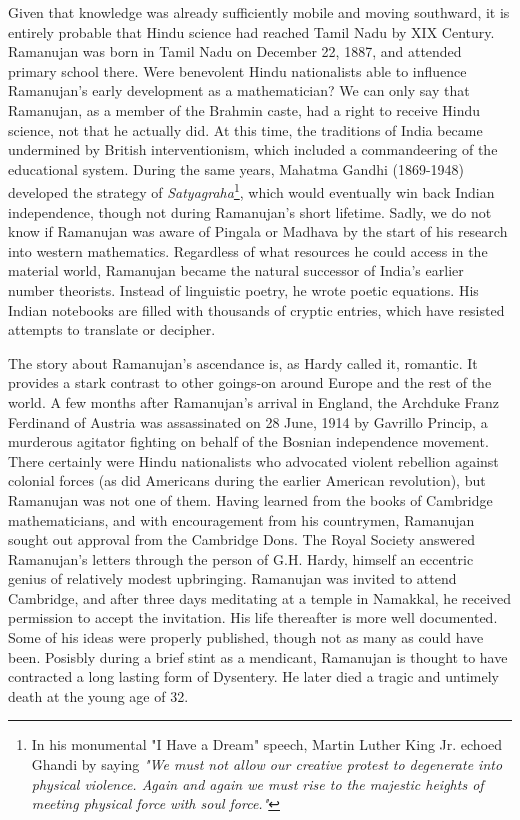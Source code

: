 \documentclass[nofootinbib,preprint]{revtex4-1}
\begin{document}
Given that knowledge was already sufficiently mobile and moving southward, it is entirely probable 
that Hindu science had reached Tamil Nadu by XIX Century. Ramanujan was born in Tamil Nadu on December 22, 
1887, and attended primary school there. Were benevolent Hindu nationalists able to influence 
Ramanujan's early development as a mathematician? We can only say that Ramanujan, as a 
member of the Brahmin caste, had a right to receive Hindu science, not that he actually did. At 
this time, the traditions of India became undermined by British interventionism, which included 
a commandeering of the educational system. During the same years, Mahatma Gandhi (1869-1948)
developed the strategy of \textit{Satyagraha}\footnote{In his monumental "I Have a Dream" speech, Martin 
Luther King Jr. echoed Ghandi by saying \textit{"We must not allow our creative protest to degenerate into 
physical violence. Again and again we must rise to the majestic heights of meeting physical force with soul 
force."} }, which would eventually win back Indian independence, though not during Ramanujan's short 
lifetime. Sadly, we do not know if Ramanujan was aware of Pingala or Madhava by the start of his 
research into western mathematics. Regardless of what resources he could access in the material world, 
Ramanujan became the natural successor of India's earlier number theorists. Instead of linguistic
poetry, he wrote poetic equations. His Indian notebooks are filled with thousands of cryptic 
entries, which have resisted attempts to translate or decipher. 

The story about Ramanujan's ascendance is, as Hardy called it, romantic.
It provides a stark contrast to other goings-on around Europe and the rest of the world. A few months 
after Ramanujan's arrival in England, the Archduke Franz Ferdinand of Austria was assassinated on 
28 June, 1914 by Gavrillo Princip, a murderous agitator fighting on behalf of the Bosnian 
independence movement. There certainly were Hindu nationalists who advocated violent rebellion 
against colonial forces (as did Americans during the earlier American revolution), but Ramanujan
was not one of them. Having learned from the books of Cambridge mathematicians, and with encouragement
from his countrymen, Ramanujan sought out approval from the Cambridge Dons. The Royal Society 
answered Ramanujan's letters through the person of G.H. Hardy, himself an eccentric genius of 
relatively modest upbringing. Ramanujan was invited to attend Cambridge, and after three days 
meditating at a temple in Namakkal, he received permission to accept the invitation. His life 
thereafter is more well documented. Some of his ideas were properly published, though not as 
many as could have been. Posisbly during a brief stint as a mendicant, Ramanujan is 
thought to have contracted a long lasting form of Dysentery. He later died a tragic and 
untimely death at the young age of 32. 
\end{document}
